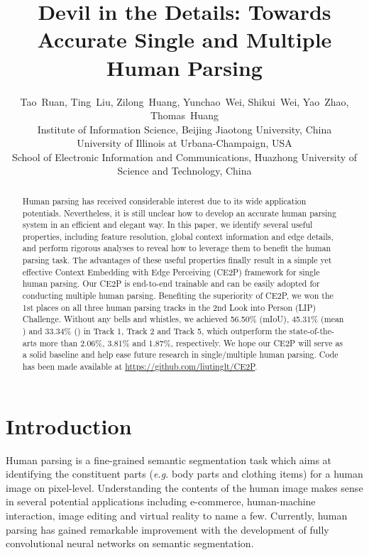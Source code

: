 \documentclass[letterpaper]{article} \usepackage{formatting-instructions-latex-2019}  \usepackage{times}  \usepackage{helvet}  \usepackage{courier}  \usepackage{url}  \usepackage{graphicx}  \frenchspacing  \setlength{\pdfpagewidth}{8.5in}  \setlength{\pdfpageheight}{11in}
\newcommand{\eg}{\emph{e.g. }}
\begin{document}
\title{Devil in the Details: Towards Accurate Single and Multiple Human Parsing}  

\author{Tao~Ruan, Ting~Liu, Zilong~Huang, Yunchao~Wei, Shikui~Wei, Yao~Zhao, Thomas~Huang \\
Institute of Information Science, Beijing Jiaotong University, China\\
University of Illinois at Urbana-Champaign, USA\\
School of Electronic Information and Communications, Huazhong University of Science and Technology, China\\
}



\maketitle
 \begin{abstract}

Human parsing has received considerable interest due to its wide application potentials. Nevertheless, it is still unclear how to develop an accurate human parsing system in an efficient and elegant way. In this paper, we identify several useful properties, including feature resolution, global context information and edge details, and perform rigorous analyses to reveal how to leverage them to benefit the human parsing task. The advantages of these useful properties finally result in a simple yet effective Context Embedding with Edge Perceiving (CE2P) framework for single human parsing. Our CE2P is end-to-end trainable and can be easily adopted for conducting multiple human parsing. Benefiting the superiority of CE2P, we won the 1st places on all three human parsing tracks in the 2nd Look into Person (LIP) Challenge. Without any bells and whistles, we achieved 56.50\% (mIoU), 45.31\% (mean ) and 33.34\% () in Track 1, Track 2 and Track 5, which outperform the state-of-the-arts more than 2.06\%, 3.81\% and 1.87\%, respectively. We hope our CE2P will serve as a solid baseline and help ease future research in single/multiple human parsing. Code has been made available at \url{https://github.com/liutinglt/CE2P}.

 \end{abstract}

\section{Introduction}

Human parsing is a fine-grained semantic segmentation task which aims at identifying the constituent parts (\eg body parts and clothing items) for a human image on pixel-level. Understanding the contents of the human image makes sense in several potential applications including e-commerce, human-machine interaction, image editing and virtual reality to name a few. Currently, human parsing has gained remarkable improvement with the development of fully convolutional neural networks on semantic segmentation. 
\end{document}
